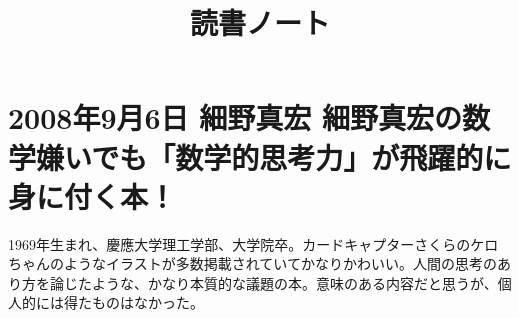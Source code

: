\documentclass[uplatex,dvipdfmx]{jsarticle} \usepackage{amsmath,amssymb,bm}
\title{読書ノート} \author{} \date{}
\begin{document}
\maketitle



\section*{2008年9月6日 細野真宏 細野真宏の数学嫌いでも「数学的思考力」が飛躍的に身に付く本！}

1969年生まれ、慶應大学理工学部、大学院卒。カードキャプターさくらのケロちゃんのようなイラストが多数掲載されていてかなりかわいい。人間の思考のあり方を論じたような、かなり本質的な議題の本。意味のある内容だと思うが、個人的には得たものはなかった。
\vspace{\baselineskip}
\begin{paracol}{2}
\switchcolumn
\end{paracol}
\end{document}
